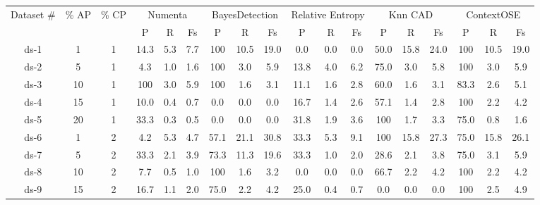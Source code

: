 
\begin{table*}[h]
	\centering
	\setlength\tabcolsep{1.5pt}
	\begin{tabular}{|c|c|c|c|c|c|c|c|c|c|c|c|c|c|c|c|c|c|}
		\toprule
		\multirow{2}[4]{*}{Dataset \#} & \multirow{2}[4]{*}{\% AP} & \multirow{2}[4]{*}{\% CP} & \multicolumn{3}{c|}{Numenta} & \multicolumn{3}{c|}{BayesDetection} & \multicolumn{3}{c|}{Relative Entropy} & \multicolumn{3}{c|}{Knn CAD} & \multicolumn{3}{c|}{ContextOSE} \\
		\cmidrule{4-18}          &       &       & P     & R     & Fs    & P     & R     & Fs    & P     & R     & Fs    & P     & R     & Fs    & P     & R     & Fs \\
		\midrule
		ds-1  & 1     & 1     & 14.3  & 5.3   & 7.7   & 100 & 10.5  & 19.0  & 0.0   & 0.0   & 0.0   & 50.0  & 15.8  & 24.0  & 100 & 10.5  & 19.0 \\
		\midrule
		ds-2  & 5     & 1     & 4.3   & 1.0   & 1.6   & 100 & 3.0   & 5.9   & 13.8  & 4.0   & 6.2   & 75.0  & 3.0   & 5.8   & 100 & 3.0   & 5.9 \\
		\midrule
		ds-3  & 10    & 1     & 100 & 3.0   & 5.9   & 100 & 1.6   & 3.1   & 11.1  & 1.6   & 2.8   & 60.0  & 1.6   & 3.1   & 83.3  & 2.6   & 5.1 \\
		\midrule
		ds-4  & 15    & 1     & 10.0  & 0.4   & 0.7   & 0.0   & 0.0   & 0.0   & 16.7  & 1.4   & 2.6   & 57.1  & 1.4   & 2.8   & 100 & 2.2   & 4.2 \\
		\midrule
		ds-5  & 20    & 1     & 33.3  & 0.3   & 0.5   & 0.0   & 0.0   & 0.0   & 31.8  & 1.9   & 3.6   & 100 & 1.7   & 3.3   & 75.0  & 0.8   & 1.6 \\
		\midrule
		ds-6  & 1     & 2     & 4.2   & 5.3   & 4.7   & 57.1  & 21.1  & 30.8  & 33.3  & 5.3   & 9.1   & 100 & 15.8  & 27.3  & 75.0  & 15.8  & 26.1 \\
		\midrule
		ds-7  & 5     & 2     & 33.3  & 2.1   & 3.9   & 73.3  & 11.3  & 19.6  & 33.3  & 1.0   & 2.0   & 28.6  & 2.1   & 3.8   & 75.0  & 3.1   & 5.9 \\
		\midrule
		ds-8  & 10    & 2     & 7.7   & 0.5   & 1.0   & 100 & 1.6   & 3.2   & 0.0   & 0.0   & 0.0   & 66.7  & 2.2   & 4.2   & 100 & 2.2   & 4.2 \\
		\midrule
		ds-9  & 15    & 2     & 16.7  & 1.1   & 2.0   & 75.0  & 2.2   & 4.2   & 25.0  & 0.4   & 0.7   & 0.0   & 0.0   & 0.0   & 100 & 2.5   & 4.9 \\

\end{tabular}
\end{table*}
